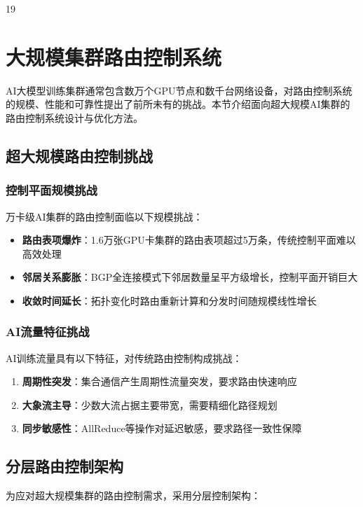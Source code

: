                                                    19

\section{大规模集群路由控制系统}

AI大模型训练集群通常包含数万个GPU节点和数千台网络设备，对路由控制系统的规模、性能和可靠性提出了前所未有的挑战。本节介绍面向超大规模AI集群的路由控制系统设计与优化方法。

\subsection{超大规模路由控制挑战}

\subsubsection{控制平面规模挑战}

万卡级AI集群的路由控制面临以下规模挑战：
\begin{itemize}
    \item \textbf{路由表项爆炸}：1.6万张GPU卡集群的路由表项超过5万条，传统控制平面难以高效处理
    \item \textbf{邻居关系膨胀}：BGP全连接模式下邻居数量呈平方级增长，控制平面开销巨大
    \item \textbf{收敛时间延长}：拓扑变化时路由重新计算和分发时间随规模线性增长
\end{itemize}

\subsubsection{AI流量特征挑战}

AI训练流量具有以下特征，对传统路由控制构成挑战：
\begin{enumerate}
    \item \textbf{周期性突发}：集合通信产生周期性流量突发，要求路由快速响应
    \item \textbf{大象流主导}：少数大流占据主要带宽，需要精细化路径规划
    \item \textbf{同步敏感性}：AllReduce等操作对延迟敏感，要求路径一致性保障
\end{enumerate}

\subsection{分层路由控制架构}

为应对超大规模集群的路由控制需求，采用分层控制架构：


